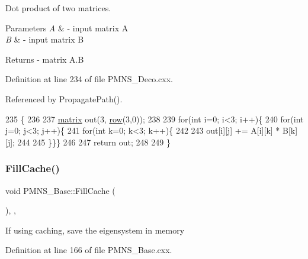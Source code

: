 Dot product of two matrices.


\begin{DoxyParams}{Parameters}
{\em A} & -\/ input matrix A \\
\hline
{\em B} & -\/ input matrix B\\
\hline
\end{DoxyParams}
\begin{DoxyReturn}{Returns}
-\/ matrix A.\+B 
\end{DoxyReturn}


Definition at line 234 of file P\+M\+N\+S\+\_\+\+Deco.\+cxx.



Referenced by Propagate\+Path().


\begin{DoxyCode}
235 \{
236 
237   \hyperlink{classOscProb_1_1PMNS__Deco_a77b4e0c041b6268910a270be0f5387c9}{matrix} out(3, \hyperlink{classOscProb_1_1PMNS__Deco_a430859c3da89582de577f8f7e75f2d16}{row}(3,0));
238   
239   \textcolor{keywordflow}{for}(\textcolor{keywordtype}{int} i=0; i<3; i++)\{
240   \textcolor{keywordflow}{for}(\textcolor{keywordtype}{int} j=0; j<3; j++)\{
241   \textcolor{keywordflow}{for}(\textcolor{keywordtype}{int} k=0; k<3; k++)\{
242 
243     out[i][j] += A[i][k] * B[k][j];
244 
245   \}\}\}
246   
247   \textcolor{keywordflow}{return} out;
248 
249 \}
\end{DoxyCode}
\mbox{\label{classOscProb_1_1PMNS__Base_a785c37fcea974628623c8881bb0fbbf9}} 
\subsubsection{\texorpdfstring{Fill\+Cache()}{FillCache()}}
{\footnotesize\ttfamily void P\+M\+N\+S\+\_\+\+Base\+::\+Fill\+Cache (\begin{DoxyParamCaption}{ }\end{DoxyParamCaption})\hspace{0.3cm}{\ttfamily [protected]}, {\ttfamily [virtual]}, {\ttfamily [inherited]}}

If using caching, save the eigensystem in memory 

Definition at line 166 of file P\+M\+N\+S\+\_\+\+Base.\+cxx.



